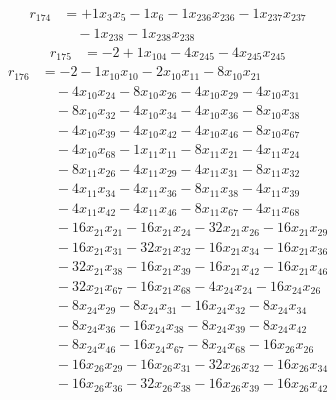 \[\begin{aligned}
r_{174} &= + 1 x_{3} x_{5} - 1 x_{6} - 1 x_{236} x_{236} - 1 x_{237} x_{237} \\
 &\quad - 1 x_{238} - 1 x_{238} x_{238}
\end{aligned}\]
\[\begin{aligned}
r_{175} &= - 2 + 1 x_{104} - 4 x_{245} - 4 x_{245} x_{245}
\end{aligned}\]
\[\begin{aligned}
r_{176} &= - 2 - 1 x_{10} x_{10} - 2 x_{10} x_{11} - 8 x_{10} x_{21} \\
 &\quad - 4 x_{10} x_{24} - 8 x_{10} x_{26} - 4 x_{10} x_{29} - 4 x_{10} x_{31} \\
 &\quad - 8 x_{10} x_{32} - 4 x_{10} x_{34} - 4 x_{10} x_{36} - 8 x_{10} x_{38} \\
 &\quad - 4 x_{10} x_{39} - 4 x_{10} x_{42} - 4 x_{10} x_{46} - 8 x_{10} x_{67} \\
 &\quad - 4 x_{10} x_{68} - 1 x_{11} x_{11} - 8 x_{11} x_{21} - 4 x_{11} x_{24} \\
 &\quad - 8 x_{11} x_{26} - 4 x_{11} x_{29} - 4 x_{11} x_{31} - 8 x_{11} x_{32} \\
 &\quad - 4 x_{11} x_{34} - 4 x_{11} x_{36} - 8 x_{11} x_{38} - 4 x_{11} x_{39} \\
 &\quad - 4 x_{11} x_{42} - 4 x_{11} x_{46} - 8 x_{11} x_{67} - 4 x_{11} x_{68} \\
 &\quad - 16 x_{21} x_{21} - 16 x_{21} x_{24} - 32 x_{21} x_{26} - 16 x_{21} x_{29} \\
 &\quad - 16 x_{21} x_{31} - 32 x_{21} x_{32} - 16 x_{21} x_{34} - 16 x_{21} x_{36} \\
 &\quad - 32 x_{21} x_{38} - 16 x_{21} x_{39} - 16 x_{21} x_{42} - 16 x_{21} x_{46} \\
 &\quad - 32 x_{21} x_{67} - 16 x_{21} x_{68} - 4 x_{24} x_{24} - 16 x_{24} x_{26} \\
 &\quad - 8 x_{24} x_{29} - 8 x_{24} x_{31} - 16 x_{24} x_{32} - 8 x_{24} x_{34} \\
 &\quad - 8 x_{24} x_{36} - 16 x_{24} x_{38} - 8 x_{24} x_{39} - 8 x_{24} x_{42} \\
 &\quad - 8 x_{24} x_{46} - 16 x_{24} x_{67} - 8 x_{24} x_{68} - 16 x_{26} x_{26} \\
 &\quad - 16 x_{26} x_{29} - 16 x_{26} x_{31} - 32 x_{26} x_{32} - 16 x_{26} x_{34} \\
 &\quad - 16 x_{26} x_{36} - 32 x_{26} x_{38} - 16 x_{26} x_{39} - 16 x_{26} x_{42} \\

\end{aligned}\]
